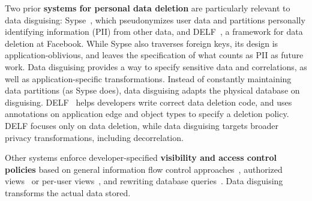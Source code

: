 
%
Two prior \textbf{systems for personal data deletion} are particularly relevant to data
disguising: Sypse~\cite{sypse}, which pseudonymizes user
data and partitions personally identifying information (PII) from other data, and
DELF~\cite{delf}, a framework for data deletion at Facebook.
%
While Sypse also traverses foreign keys, its design is application-oblivious, and leaves
the specification of what counts as PII as future work.
%
Data disguising provides a way to specify sensitive data and correlations, as well as
application-specific transformations.
%
Instead of constantly maintaining data partitions (as Sypse does), data disguising adapts
the physical database on disguising.
%
%
%
DELF~\cite{delf} helps developers write correct data deletion code, and uses annotations on
application edge and object types to specify a deletion policy.
%
DELF focuses only on data deletion, while data disguising targets broader privacy
transformations, including decorrelation.
%


%
Other systems enforce developer-specified \textbf{visibility and access control policies}
based on general information flow control approaches~\cite{static, jeeves, jif, hails, ifdb},
%
authorized views~\cite{oracle} or per-user views~\cite{multiverse}, and rewriting database queries~\cite{qapla, sieve}.
%
Data disguising transforms the actual data stored.
%

